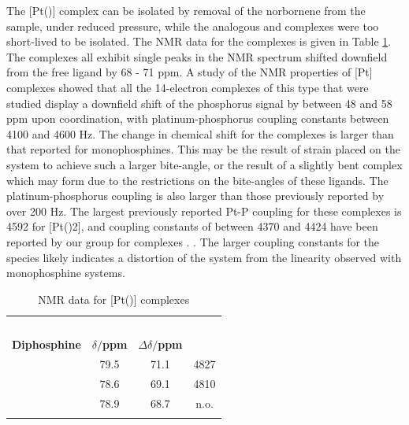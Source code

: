 The [Pt(\tButhixantphos)] complex can be isolated by removal of the norbornene from the sample, under reduced pressure, while the analogous \tBusixantphos{} and \tBuxantphos{} complexes were too short-lived to be isolated.  The \phosphorus{} NMR data for the complexes is given in Table \ref{table:Pt14NMR}.  The complexes all exhibit single peaks in the \phosphorus{} NMR spectrum shifted downfield from the free ligand by 68 - 71 ppm.  A study of the \phosphorus{} NMR properties of [Pt] complexes showed that all the 14-electron complexes of this type that were studied display a downfield shift of the phosphorus signal by between 48 and 58 ppm upon coordination, with platinum-phosphorus coupling constants between 4100 and 4600 Hz.\cite{Mann1980}  The change in chemical shift for the \tBuxantphos{} complexes is larger than that reported for monophosphines.  This may be the result of strain placed on the system to achieve such a larger bite-angle, or the result of a slightly bent complex which may form due to the restrictions on the bite-angles of these ligands.  The platinum-phosphorus coupling is also larger than those previously reported by over 200 Hz.  The largest previously reported Pt-P coupling for these complexes is 4592 for [Pt()2], and coupling constants of between 4370 and 4424 have been reported by our group for complexes .  .  The larger coupling constants for the \tBuxantphos{} species likely indicates a distortion of the system from the linearity observed with monophosphine systems.  

\begin{table}[htbp]
\caption[\phosphorus{} NMR data for [Pt(\tBuxantphos){]} complexes]{\phosphorus{} NMR data for [Pt(\tBuxantphos){]} complexes}
\vspace{1em}
\label{table:Pt14NMR}
\small
\begin{center}
\begin{tabular}{l c c c}
\toprule{}
	~~ & \multicolumn{3}{c}{\bfseries{\phosphorus}} \\
	\cmidrule(lr){2-4}
	\bfseries{Diphosphine}&\bfseries{$\delta/$ppm}&\bfseries{$\Delta\delta/$ppm}&\bfseries{\JPtP}\\
	\midrule{}
	\tBuSixantphos 		& 79.5 & 71.1 & 4827 \\
	\tBuThixantphos 	& 78.6 & 69.1 & 4810 \\
	\tBuXantphos		& 78.9 & 68.7 & n.o.\\
	\bottomrule{}
\end{tabular}
\end{center}
\end{table}

